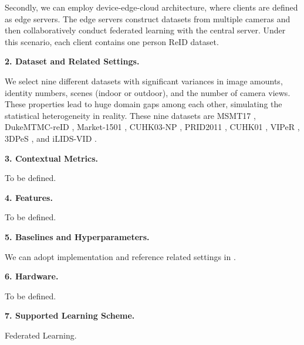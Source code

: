 Secondly, we can employ device-edge-cloud architecture, where clients are defined as edge servers. The edge servers construct datasets from multiple cameras and then collaboratively conduct federated learning with the central server. Under this scenario, each client contains one person ReID dataset.

\textbf{2. Dataset and Related Settings.} 

We select nine different datasets with significant variances in image amounts, identity numbers, scenes (indoor or outdoor), and the number of camera views. These properties lead to huge domain gaps among each other, simulating the statistical heterogeneity in reality. These nine datasets are MSMT17 \cite{Wei2017Msmt}, DukeMTMC-reID \cite{zheng2017dukemtmc-reid}, 
Market-1501 \cite{Zheng2015Market1501}, CUHK03-NP \cite{Li2014CUHK03}, PRID2011 \cite{prid2011}, CUHK01 \cite{li2012cuhk01}, VIPeR \cite{Gray2008ViewpointIP}, 3DPeS \cite{3dpes}, and iLIDS-VID \cite{iLIDS-VID}. 



\textbf{3. Contextual Metrics.}

To be defined. 

\textbf{4. Features.}

To be defined. 

\textbf{5. Baselines and Hyperparameters.}

We can adopt implementation and reference related settings in \cite{zhuang2020fedreid, zhuang2021easyfl}.

\textbf{6. Hardware.}

To be defined.


\textbf{7. Supported Learning Scheme.}

Federated Learning. 
